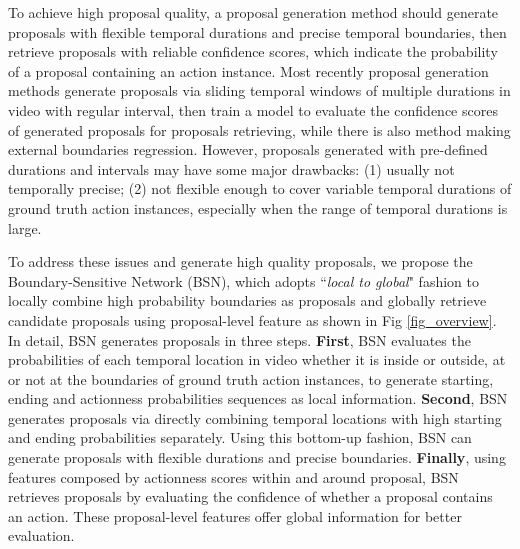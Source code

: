 \documentclass[runningheads]{llncs}
\begin{document}
To achieve high proposal quality, a proposal generation method should generate proposals with flexible temporal durations and precise temporal boundaries, then retrieve  proposals with reliable confidence scores, which indicate the probability of  a proposal containing an action instance.
Most recently proposal generation methods \cite{sst_buch_cvpr17,fast_temporal_activity_cvpr16,escorcia2016daps,shou2016action} generate proposals via sliding temporal windows of multiple durations in video with regular interval, then train a model to evaluate the confidence scores of generated proposals for proposals retrieving, while there is also method \cite{gao2017turn} making external boundaries regression.
However, proposals generated with pre-defined durations and intervals may have some major drawbacks: (1) usually not temporally precise; (2) not flexible enough to cover variable temporal durations of ground truth action instances, especially when the range of temporal durations is large.



To address these issues and generate high quality proposals, we propose the  Boundary-Sensitive Network (BSN), which adopts ``\emph{local to global}" fashion to locally combine high probability boundaries as proposals and globally retrieve candidate proposals using proposal-level feature as shown in Fig \ref{fig_overview}.
%
In detail, BSN generates proposals in three steps. 
{\bf First}, BSN evaluates the probabilities of each temporal location in video whether it is inside or outside, at or not at the boundaries of ground truth action instances, to generate starting, ending and actionness probabilities sequences as local information.
{\bf Second}, BSN generates proposals via directly  combining temporal locations with high starting and ending probabilities separately. Using this bottom-up fashion, BSN can generate proposals with flexible durations and precise boundaries. 
{\bf Finally}, using features composed by actionness scores within and around proposal, BSN retrieves proposals by evaluating the confidence of whether a proposal contains an action.  These proposal-level features offer global information for better evaluation.
\end{document}

